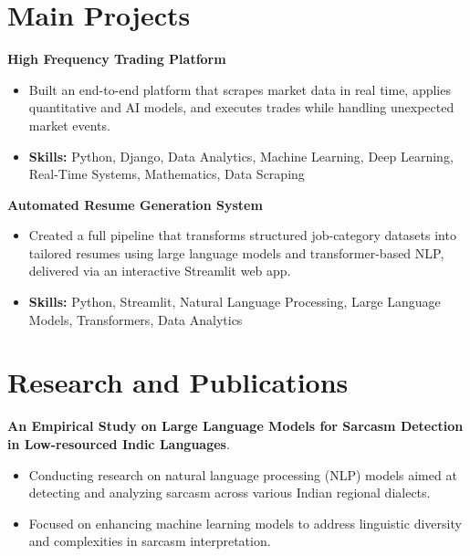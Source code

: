 \documentclass[a4paper,11pt]{article}
\begin{document}
\section{\textbf{Main Projects}}

\vspace{1mm}
  \textbf{High Frequency Trading Platform  }
\vspace{-1.5mm} %
\begin{itemize}
  \item Built an end-to-end platform that scrapes market data in real time, applies quantitative and AI models, and executes trades while handling unexpected market events.
\vspace{-3mm}
  \item \textbf{Skills:} Python, Django, Data Analytics, Machine Learning, Deep Learning, Real-Time Systems, Mathematics, Data Scraping
\end{itemize}


\vspace{1mm}
   \textbf{Automated Resume Generation System }
\vspace{-1.5mm} %
\begin{itemize}
  \item Created a full pipeline that transforms structured job-category datasets into tailored resumes using large language models and transformer-based NLP, delivered via an interactive Streamlit web app.
\vspace{-3mm}
  \item \textbf{Skills:} Python, Streamlit, Natural Language Processing, Large Language Models, Transformers, Data Analytics
\end{itemize}



\section{\textbf{Research and Publications} \hfill }
\vspace{1mm}
  \textbf{An Empirical Study on Large Language Models for Sarcasm Detection in Low-resourced Indic Languages}.
\vspace{-1mm} %
\begin{itemize}
  \item Conducting research on natural language processing (NLP) models aimed at detecting and analyzing sarcasm across various Indian regional dialects.
\vspace{-3mm}
  \item Focused on enhancing machine learning models to address linguistic diversity and complexities in sarcasm interpretation.
\end{itemize}
\end{document}
